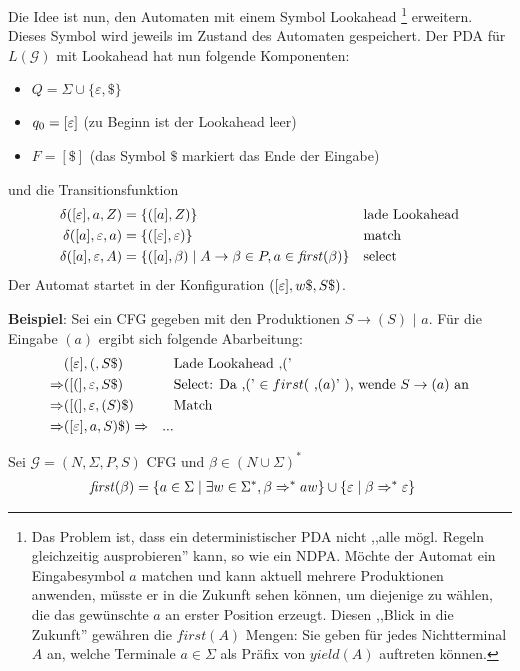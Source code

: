Die Idee ist nun, den Automaten mit einem Symbol Lookahead \footnote{Das Problem ist, dass ein deterministischer PDA nicht ,,alle mögl. Regeln gleichzeitig ausprobieren'' kann, so wie ein NDPA. Möchte der Automat ein Eingabesymbol $a$ matchen und kann aktuell mehrere Produktionen anwenden, müsste er in die Zukunft sehen können, um diejenige zu wählen, die das gewünschte $a$ an erster Position erzeugt. Diesen ,,Blick in die Zukunft'' gewähren die $first(A)$ Mengen: Sie geben für jedes Nichtterminal $A$ an, welche Terminale $a \in \Sigma$ als Präfix von $yield(A)$ auftreten können.} 
erweitern. Dieses Symbol wird jeweils im Zustand des Automaten
gespeichert. Der PDA für $L (\mathcal{G})$ mit Lookahead hat nun
folgende Komponenten:
\begin{itemize}
\item $Q = \Sigma\cup \{\varepsilon, \$\}$
\item $q_0 = [\varepsilon]$ (zu Beginn ist der Lookahead leer)
\item $F = [\$]$  (das Symbol $\$$ markiert das Ende der Eingabe)
\end{itemize}
und die Transitionsfunktion
\begin{align*}
  \delta ([\varepsilon], a, Z) & = \{([a], Z) \} & & \text{lade Lookahead} \\
  \delta ([a], \varepsilon, a) & = \{([\varepsilon], \varepsilon) \} && \text{match}
  \\
  \delta ([a], \varepsilon, A) & = \{([a], \beta) \mid A\to\beta\in P, a \in
  \mathit{first} (\beta) \} && \text{select}
\end{align*}
Der Automat startet in der Konfiguration $([\varepsilon], w\$, S\$)$.

\textbf{Beispiel}: Sei ein CFG gegeben mit den Produktionen $S \to ( S )$ $ |$ $ a$. Für die Eingabe $(a)$ ergibt sich folgende Abarbeitung:
\begin{align*}
              & ([\varepsilon], (, S\$ )   && \text{Lade Lookahead ,('}\\
  \Rightarrow & ([(], \varepsilon, S\$ )   && \text{Select: Da ,(' $\in first($ ,$(a)$' $ )$, wende $S \to (a)$ an}\\
  \Rightarrow & ([(], \varepsilon, (S)\$ ) && \text{Match}\\
  \Rightarrow & ([\varepsilon], a, S)\$)
  \Rightarrow & ...
\end{align*}

\begin{Def}
  Sei $\mathcal{G} = (N, \Sigma, P, S)$ CFG und $\beta \in
  (N\cup\Sigma)^*$
  \begin{align*}
    \mathit{first} (\beta) &= \{ a \in \Sigma \mid \exists w\in
    \Sigma^* , \beta \=>^* aw \} \cup \{\Eps \mid \beta \=>^* \Eps \}
  \end{align*}
\end{Def}


